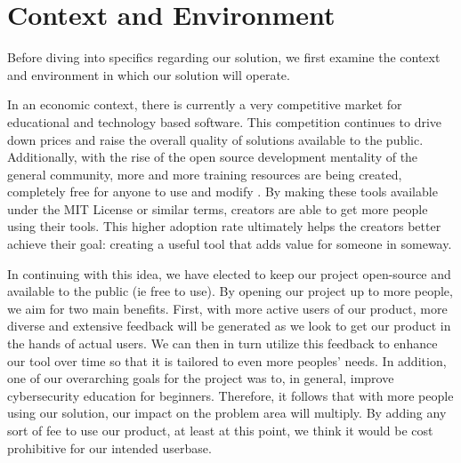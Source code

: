 \documentclass[openright]{report}
\begin{document}
\section{Context and Environment}

\par Before diving into specifics regarding our solution, we first examine the context and environment in which our solution will operate.

\par In an economic context, there is currently a very competitive market for educational and technology based software. This competition continues to drive down prices and raise the overall quality of solutions available to the public. Additionally, with the rise of the open source development mentality of the general community, more and more training resources are being created, completely free for anyone to use and modify \cite{open_source}. By making these tools available under the MIT License or similar terms, creators are able to get more people using their tools. This higher adoption rate ultimately helps the creators better achieve their goal: creating a useful tool that adds value for someone in someway.

\par In continuing with this idea, we have elected to keep our project open-source and available to the public (ie free to use). By opening our project up to more people, we aim for two main benefits. First, with more active users of our product, more diverse and extensive feedback will be generated as we look to get our product in the hands of actual users. We can then in turn utilize this feedback to enhance our tool over time so that it is tailored to even more peoples' needs. In addition, one of our overarching goals for the project was to, in general, improve cybersecurity education for beginners. Therefore, it follows that with more people using our solution, our impact on the problem area will multiply. By adding any sort of fee to use our product, at least at this point, we think it would be cost prohibitive for our intended userbase.
\end{document}
